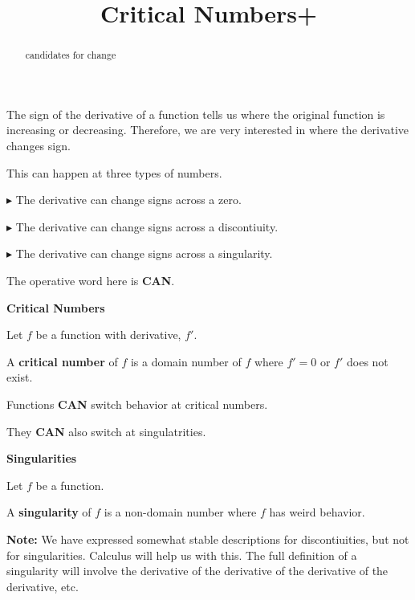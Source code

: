\documentclass{ximera}
\title{Critical Numbers+}
\begin{document}
\begin{abstract}
candidates for change
\end{abstract}
\maketitle








The sign of the derivative of a function tells us where the original function is increasing or decreasing.  Therefore, we are very interested in where the derivative changes sign.

This can happen at three types of numbers. 


\textbf{\textcolor{red!70!darkgray}{$\blacktriangleright$}} The derivative can change signs across a zero. 


\textbf{\textcolor{red!70!darkgray}{$\blacktriangleright$}} The derivative can change signs across a discontiuity. 


\textbf{\textcolor{red!70!darkgray}{$\blacktriangleright$}}  The derivative can change signs across a singularity. 



\begin{center}
The operative word here is \textbf{\textcolor{red!80!black}{CAN}}.
\end{center}




\begin{idea}  \textbf{\textcolor{blue!55!black}{Critical Numbers}}  

Let $f$ be a function with derivative, $f'$. 


A \textbf{critical number} of $f$ is a domain number of $f$ where $f' = 0$ or $f'$ does not exist.


\end{idea}

Functions \textbf{\textcolor{red!70!black}{CAN}} switch behavior at critical numbers. 

They \textbf{\textcolor{red!70!black}{CAN}} also switch at singulatrities.






\begin{idea}  \textbf{\textcolor{blue!55!black}{Singularities}}  

Let $f$ be a function. 

A \textbf{singularity} of $f$ is a non-domain number where $f$ has weird behavior.





\textbf{Note:} We have expressed somewhat stable descriptions for discontiuities, but not for singularities.  Calculus will help us with this. The full definition of a singularity will involve the derivative of the derivative of the derivative of the derivative, etc.



\end{idea}
\end{document}
